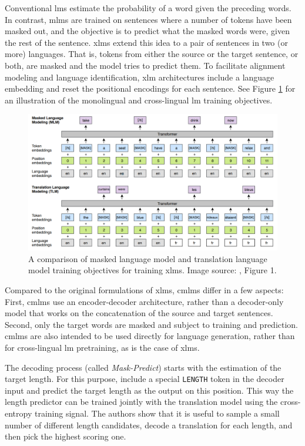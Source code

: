 Conventional \acp{lm} estimate the probability of a word given the preceding
words.  In contrast, \acp{mlm} are trained on sentences where a number of
tokens have been masked out, and the objective is to predict what the masked
words were, given the rest of the sentence. \Acp{xlm} extend this idea to a
pair of sentences in two (or more) languages. That is, tokens from either the
source or the target sentence, or both, are masked and the model tries to
predict them.  To facilitate alignment modeling and language identification,
\ac{xlm} architectures include a language embedding and reset the positional
encodings for each sentence. See Figure \ref{fig:mlm-xlm-example} for an
illustration of the monolingual and cross-lingual \ac{lm} training objectives.

\begin{figure}
  \centering

  \includegraphics[width=\textwidth]{img/mlm-xlm.png}

  \caption{A comparison of masked language model and translation language model
    training objectives for training \aclp{xlm}. Image source:
    \citet{conneau-lample-2019-cross}, Figure 1.}%
  \label{fig:mlm-xlm-example}
\end{figure}

Compared to the original formulations of \acp{xlm}, \acp{cmlm} differ in a few
aspects: First, \acp{cmlm} use an encoder-decoder architecture, rather than a
decoder-only model that works on the concatenation of the source and target
sentences. Second, only the target words are masked and subject to training and
prediction. \Acp{cmlm} are also intended to be used directly for language
generation, rather than for cross-lingual \ac{lm} pretraining, as is the case
of \acp{xlm}.

The decoding process (called \emph{Mask-Predict}) starts with the estimation of
the target length. For this purpose, \citet{ghazvininejad-etal-2019-mask}
include a special \texttt{LENGTH} token in the decoder input and predict the
target length as the output on this position. This way the length predictor can
be trained jointly with the translation model using the cross-entropy training
signal. The authors show that it is useful to sample a small number of
different length candidates, decode a translation for each length, and then
pick the highest scoring one.


